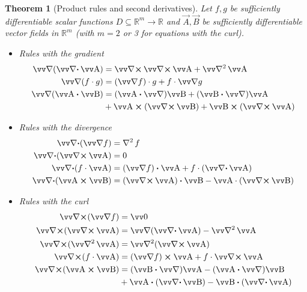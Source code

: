 \documentclass[twocolumn, margin=small]{tex/hsrzf}
\theoremstyle{fuvarzf}
\newtheorem{theorem}{Theorem}
\begin{document}
\begin{theorem}[Product rules and second derivatives]
  Let \(f,g\) be sufficiently differentiable scalar functions \(D
  \subseteq\mathbb{R}^m \to \mathbb{R}\) and \(\vec{A}, \vec{B}\) be
  sufficiently differentiable vector fields in \(\mathbb{R}^m\) (with \(m = 2\)
  or 3 for equations with the curl).
  \begin{itemize}
    \item Rules with the gradient
      \begin{align*}
        \grad (\div \vec{A}) &= \curl \curl \vec{A} + \vlaplacian \vec{A} \\
        \grad (f\cdot g) &= (\grad f)\cdot g + f\cdot \grad g \\
        \grad (\vec{A} \dotp \vec{B}) &= 
          (\vec{A} \dotp \grad) \vec{B}
          + (\vec{B} \dotp \grad) \vec{A} \\
          & + \vec{A} \crossp (\curl \vec{B})
          + \vec{B} \crossp (\curl \vec{A})
      \end{align*}
    \item Rules with the divergence
      \begin{align*}
        \div (\grad f) &= \laplacian f \\
        \div (\curl \vec{A}) &= 0 \\
        \div (f\cdot \vec{A}) &= (\grad f) \dotp \vec{A} + f\cdot (\div \vec{A}) \\
        \div (\vec{A}\crossp\vec{B}) &= (\curl \vec{A})\dotp \vec{B} 
          - \vec{A} \cdot (\curl\vec{B})
      \end{align*}
    \item Rules with the curl
      \begin{align*}
        \curl (\grad f) &= \vec{0} \\
        \curl (\curl \vec{A}) &= \grad (\div \vec{A}) - \vlaplacian \vec{A} \\
        \curl (\vlaplacian \vec{A}) &= \vlaplacian (\curl \vec{A}) \\
        \curl (f\cdot \vec{A}) &= (\grad f)\crossp \vec{A} + f\cdot \curl \vec{A} \\
        \curl (\vec{A}\crossp\vec{B}) &= 
          (\vec{B} \dotp \grad) \vec{A} - (\vec{A} \dotp \grad) \vec{B} \\
          &+ \vec{A} \dotp (\div \vec{B}) - \vec{B} \dotp (\div \vec{A})
      \end{align*}
  \end{itemize}
\end{theorem}
\end{document}
